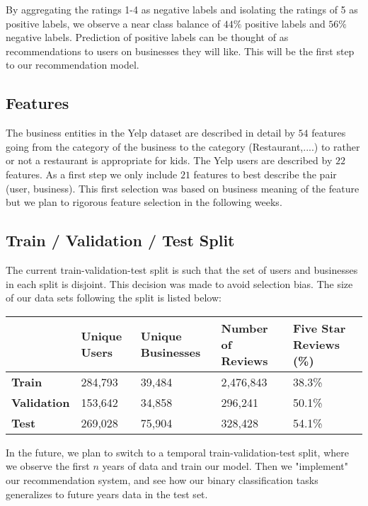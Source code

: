 \documentclass[letterpaper, 11pt]{article}
\begin{document}
By aggregating the ratings 1-4 as negative labels and isolating the ratings of 5 as positive labels, we observe a near class balance of $44\%$ positive labels and $56\%$ negative labels. Prediction of positive labels can be thought of as recommendations to users on businesses they will like. This will be the first step to our recommendation model.

\newpage
\subsection{Features}

The business entities in the Yelp dataset are described in detail by $54$ features going from the category of the business to the category (Restaurant,....) to rather or not a restaurant is appropriate for kids. The Yelp users are described by $22$ features. As a first step we only include $21$ features to best describe the pair (user, business). This first selection was based on business meaning of the feature but we plan to rigorous feature selection in the following weeks.

\subsection{Train / Validation / Test Split}

The current train-validation-test split is such that the set of users and businesses in each split is disjoint. This decision was made to avoid selection bias. The size of our data sets following the split is listed below:

\begin{center}
    \begin{tabular}{lllll}
    \hline
      & \textbf{\textbf{Unique Users}} & \textbf{\textbf{Unique Businesses}} & \textbf{\textbf{Number of Reviews}} & \textbf{\textbf{Five Star Reviews} (\%)}  \\
      \hline
\textbf{Train} & 284,793       & 39,484             & 2,476,843           & 38.3\%                 \\
\textbf{Validation} & 153,642       & 34,858             & 296,241            & 50.1\%                 \\
\textbf{Test}  & 269,028       & 75,904             & 328,428            & 54.1\%
\end{tabular}
\end{center}

\smallskip

In the future, we plan to switch to a temporal train-validation-test split, where we observe the first $n$ years of data and train our model. Then we "implement" our recommendation system, and see how our binary classification tasks generalizes to future years data in the test set.
\end{document}
